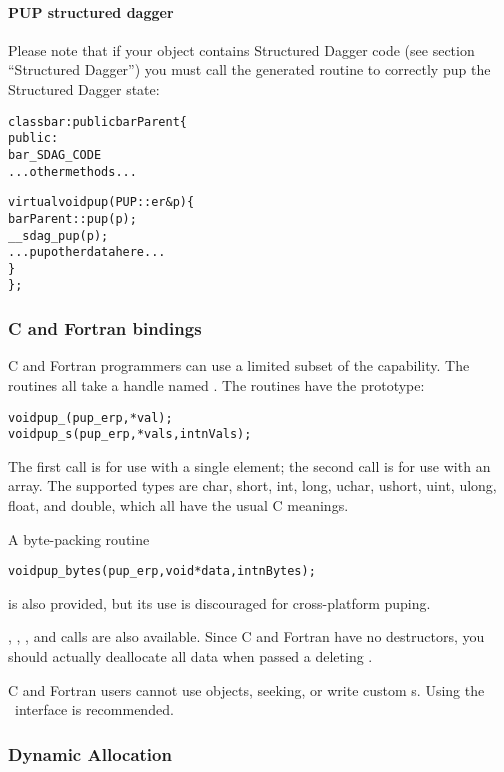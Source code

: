\paragraph{PUP structured dagger}
\label{sec:pupsdag}

Please note that if your object contains Structured Dagger code (see section ``Structured Dagger'') you must call the generated routine  to correctly pup the Structured Dagger state:

\begin{alltt}
class bar : public barParent \{
 public:
    bar_SDAG_CODE 
    ...other methods...

    virtual void pup(PUP::er& p) \{
      barParent::pup(p);
      __sdag_pup(p);
      ...pup other data here...
    \}
\};
\end{alltt}


\subsubsection{C and Fortran bindings}
C and Fortran programmers can use a limited subset of the
 capability.  The routines all take a 
handle named .  The routines 
have the prototype:
\begin{alltt}
void pup\_(pup\_er p, *val);
void pup\_s(pup\_er p, *vals,int nVals);
\end{alltt}
The first call is for use with a single element;
the second call is for use with an array.
The supported types are char, short, int, long,
uchar, ushort, uint, ulong, float, and double,
which all have the usual C meanings.

A byte-packing routine
\begin{alltt}
void pup\_bytes(pup\_er p,void *data,int nBytes);
\end{alltt}
is also provided, but its use is discouraged
for cross-platform puping.

, , ,
and  calls are also available.
Since C and Fortran have no destructors, you should 
actually deallocate all data when passed a deleting .

C and Fortran users cannot use  objects, 
seeking, or write custom s. Using the \CC\
interface is recommended.

\subsubsection{Dynamic Allocation}
\label{sec:pupdynalloc}

